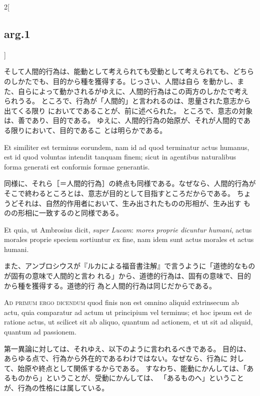 \documentclass[paper=a4paper,fontsize=10pt,jafontsize=9pt,titlepage]{jlreq}
\begin{document}
\begin{paracol}{2}[\subsection{arg.1}]
\switchcolumn

そして人間的行為は、能動として考えられても受動として考えられても、どちら
 のしかたでも、目的から種を獲得する。じっさい、人間は自ら
 を動かし、また、自らによって動かされるがゆえに、人間的行為はこの両方のしかたで考え
 られうる。
ところで、行為が「人間的」と言われるのは、思量された意志から出てくる限り
 においてであることが、前に述べられた。
ところで、意志の対象は、善であり、目的である。
ゆえに、人間的行為の始原が、それが人間的である限りにおいて、目的であるこ
 とは明らかである。

\switchcolumn*

Et similiter est terminus eorundem, nam id ad quod terminatur
actus humanus, est id quod voluntas intendit tanquam finem; sicut in
agentibus naturalibus forma generati est conformis formae generantis.

\switchcolumn

同様に、それら［＝人間的行為］の終点も同様である。なぜなら、人間的行為が
 そこで終わるところとは、意志が目的として目指すところだからである。
ちょうどそれは、自然的作用者において、生み出されたものの形相が、生み出す
 ものの形相に一致するのと同様である。

\switchcolumn*

Et
quia, ut Ambrosius dicit, {\itshape super Lucam}: {\itshape mores proprie dicuntur humani},
actus morales proprie speciem sortiuntur ex fine, nam idem sunt actus
morales et actus humani.

\switchcolumn

また、アンブロシウスが『ルカによる福音書注解』で言うように「道徳的なものが固有の意味で人間的と言わ
 れる」から、道徳的行為は、固有の意味で、目的から種を獲得する。道徳的行
 為と人間的行為は同じだからである。

\switchcolumn*[\subsection{ad.1}]

{\scshape Ad primum ergo dicendum} quod finis non
est omnino aliquid extrinsecum ab actu, quia comparatur ad actum ut
principium vel terminus; et hoc ipsum est de ratione actus, ut scilicet
sit ab aliquo, quantum ad actionem, et ut sit ad aliquid, quantum ad
passionem.

\switchcolumn

第一異論に対しては、それゆえ、以下のように言われるべきである。
目的は、あらゆる点で、行為から外在的であるわけではない。なぜなら、行為に
 対して、始原や終点として関係するからである。
すなわち、能動にかんしては、「あるものから」ということが、受動にかんしては、
 「あるものへ」ということが、行為の性格には属している。


\end{paracol}
\end{document}
